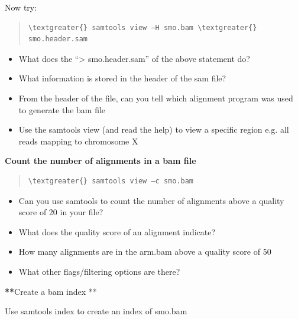 \documentclass[letterpaper,10pt,english]{sphinxmanual}
\begin{document}
Now try:
\begin{quote}

\begin{Verbatim}[commandchars=\\\{\}]
\textgreater{} samtools view –H smo.bam \textgreater{} smo.header.sam
\end{Verbatim}
\end{quote}
\begin{itemize}
\item {} 
What does the “\textgreater{} smo.header.sam” of the above statement do?

\item {} 
What information is stored in the header of the sam file?

\item {} 
From the header of the file, can you tell which alignment program was used to generate the bam file

\item {} 
Use the samtools view (and read the help) to view a specific region e.g. all reads mapping to chromosome X

\end{itemize}

\textbf{Count the number of alignments in a bam file}
\begin{quote}

\begin{Verbatim}[commandchars=\\\{\}]
\textgreater{} samtools view –c smo.bam
\end{Verbatim}
\end{quote}
\begin{itemize}
\item {} 
Can you use samtools to count the number of alignments above a quality score of 20 in your file?

\item {} 
What does the quality score of an alignment indicate?

\item {} 
How many alignments are in the arm.bam above a quality score of 50

\item {} 
What other flags/filtering options are there?

\end{itemize}

{\color{red}\bfseries{}**}Create a bam index **

Use samtools index to create an index of smo.bam
\end{document}
